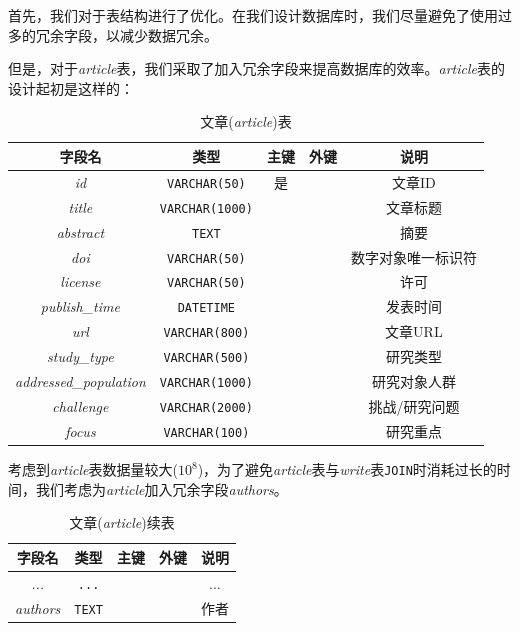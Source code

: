 \documentclass[UTF8,openany]{ctexbook}
\begin{document}
首先，我们对于表结构进行了优化。在我们设计数据库时，我们尽量避免了使用过多的冗余字段，以减少数据冗余。

但是，对于\textit{article}表，我们采取了加入冗余字段来提高数据库的效率。\textit{article}表的设计起初是这样的：

\begin{table}[H]
    \centering
    \begin{tabular}{|c|c|c|c|c|}
        \hline
        \textbf{字段名} & \textbf{类型} & \textbf{主键} & \textbf{外键} & \textbf{说明} \\
        \hline
        \textit{id} & \texttt{VARCHAR(50)} & 是 &  & 文章ID \\
        \hline
        \textit{title} & \texttt{VARCHAR(1000)} &  &  & 文章标题 \\
        \hline
        \textit{abstract} & \texttt{TEXT} &  &  & 摘要 \\
        \hline
        \textit{doi} & \texttt{VARCHAR(50)} &  &  & 数字对象唯一标识符 \\
        \hline
        \textit{license} & \texttt{VARCHAR(50)} &  &  & 许可 \\
        \hline
        \textit{publish\_time} & \texttt{DATETIME} &  &  & 发表时间 \\
        \hline
        \textit{url} & \texttt{VARCHAR(800)} &  &  & 文章URL \\
        \hline
        \textit{study\_type} & \texttt{VARCHAR(500)} &  &  & 研究类型 \\
        \hline
        \textit{addressed\_population} & \texttt{VARCHAR(1000)} &  &  & 研究对象人群 \\
        \hline
        \textit{challenge} & \texttt{VARCHAR(2000)} &  &  & 挑战/研究问题 \\
        \hline
        \textit{focus} & \texttt{VARCHAR(100)} &  &  & 研究重点 \\
        \hline
    \end{tabular}
    \caption{文章(\textit{article})表}
\end{table}

考虑到\textit{article}表数据量较大($10^8$)，为了避免\textit{article}表与\textit{write}表\texttt{JOIN}时消耗过长的时间，我们考虑为\textit{article}加入冗余字段\textit{authors}。

\begin{table}[H]
    \centering
    \begin{tabular}{|c|c|c|c|c|}
        \hline
        \textbf{字段名} & \textbf{类型} & \textbf{主键} & \textbf{外键} & \textbf{说明} \\
        \hline
        \textit{...} & \texttt{...} &  &  & ... \\
        \hline
        \textit{authors} & \texttt{TEXT} &  &  & 作者 \\
        \hline
    \end{tabular}
    \caption{文章(\textit{article})续表}
\end{table}
\end{document}
